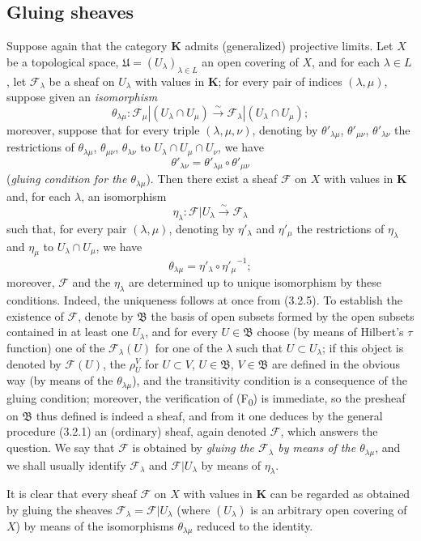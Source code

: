 \subsection{Gluing sheaves}
\label{subsection:0.3.3}

\begin{env}[3.3.1]
\label{0.3.3.1}
Suppose again that the category $\mathbf{K}$ admits (generalized) projective limits.
Let $X$ be a topological space,
$\mathfrak{U}=(U_\lambda)_{\lambda\in L}$ an open covering of $X$, and
for each $\lambda\in L$, let $\mathcal{F}_\lambda$ be a sheaf on
$U_\lambda$ with values in $\mathbf{K}$; for every pair of indices
$(\lambda,\mu)$, suppose given an \emph{isomorphism}
\[
  \theta_{\lambda\mu}:
  \mathcal{F}_\mu|(U_\lambda\cap U_\mu)
  \xrightarrow{\sim}
  \mathcal{F}_\lambda|(U_\lambda\cap U_\mu);
\]
moreover, suppose that for every triple $(\lambda,\mu,\nu)$, denoting by
$\theta'_{\lambda\mu}$, $\theta'_{\mu\nu}$, $\theta'_{\lambda\nu}$ the
restrictions of $\theta_{\lambda\mu}$, $\theta_{\mu\nu}$,
$\theta_{\lambda\nu}$ to $U_\lambda\cap U_\mu\cap U_\nu$, we have
\[
  \theta'_{\lambda\nu}
  =\theta'_{\lambda\mu}\circ\theta'_{\mu\nu}
\]
(\emph{gluing condition for the $\theta_{\lambda\mu}$}). Then there
exist a sheaf $\mathcal{F}$ on $X$ with values in $\mathbf{K}$ and, for
each $\lambda$, an isomorphism
\[
  \eta_\lambda:\mathcal{F}|U_\lambda\xrightarrow{\sim}\mathcal{F}_\lambda
\]
such that, for every pair $(\lambda,\mu)$, denoting by
$\eta'_\lambda$ and $\eta'_\mu$ the restrictions of $\eta_\lambda$ and
$\eta_\mu$ to $U_\lambda\cap U_\mu$, we have
\[
  \theta_{\lambda\mu}=\eta'_\lambda\circ{\eta'_\mu}^{-1};
\]
moreover, $\mathcal{F}$ and the $\eta_\lambda$ are determined up to unique
isomorphism by these conditions. Indeed, the uniqueness follows
at once from (3.2.5). To establish the existence of $\mathcal{F}$, denote by
$\mathfrak{B}$ the basis of open subsets formed by the open subsets contained in at least one
$U_\lambda$, and for every $U\in\mathfrak{B}$ choose (by means of Hilbert's
$\tau$ function) one of the $\mathcal{F}_\lambda(U)$ for one of the
$\lambda$ such that $U\subset U_\lambda$; if this object is denoted by
$\mathcal{F}(U)$, the $\rho_U^V$ for $U\subset V$, $U\in\mathfrak{B}$,
$V\in\mathfrak{B}$ are defined in the obvious way (by means of the
$\theta_{\lambda\mu}$), and the transitivity condition is a consequence of the
gluing condition; moreover, the verification of
(F\textsubscript{0}) is immediate, so the presheaf on $\mathfrak{B}$
thus defined is indeed a sheaf, and from it one deduces by the general procedure
(3.2.1) an (ordinary) sheaf, again denoted $\mathcal{F}$, which answers the
question. We say that $\mathcal{F}$ is obtained by \emph{gluing the
$\mathcal{F}_\lambda$ by means of the $\theta_{\lambda\mu}$}, and we shall usually
identify $\mathcal{F}_\lambda$ and $\mathcal{F}|U_\lambda$ by means of
$\eta_\lambda$.

It is clear that every sheaf $\mathcal{F}$ on $X$ with values in
$\mathbf{K}$ can be regarded as obtained by gluing the sheaves
$\mathcal{F}_\lambda=\mathcal{F}|U_\lambda$ (where $(U_\lambda)$ is an
arbitrary open covering of $X$) by means of the isomorphisms
$\theta_{\lambda\mu}$ reduced to the identity.
\end{env}

